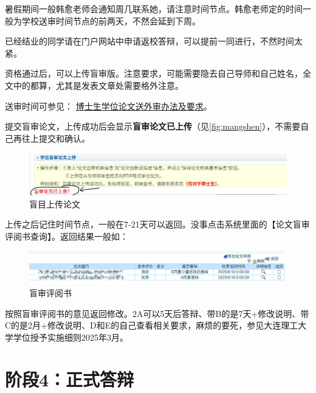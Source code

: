 \documentclass[12pt,a4paper]{ctexart}
\begin{document}
暑假期间一般韩愈老师会通知周几联系她，请注意时间节点。韩愈老师定的时间一般为学校送审时间节点的前两天，不然会延到下周。

已经结业的同学请在门户网站中申请返校答辩，可以提前一同进行，不然时间太紧。

资格通过后，可以上传盲审版。注意要求，可能需要隐去自己导师和自己姓名，全文中的都算，尤其是发表文章处需要格外注意。

送审时间可参见：
\href{https://gs.dlut.edu.cn/info/1207/3992.htm}{博士生学位论文送外审办法及要求}。

提交盲审论文，上传成功后会显示\textbf{盲审论文已上传}（见\autoref{fig:mangshen}），不需要自己再往上提交和确认。

  \begin{figure}[H]
    \centering
    \includegraphics[width=1.0\textwidth]{images/mangshen.jpg}  %
    \caption{盲目上传论文}
    \label{fig:mangshen}
  \end{figure}

 上传之后记住时间节点，一般在7-21天可以返回。没事点击系统里面的【论文盲审评阅书查询】。返回结果一般如：

   \begin{figure}[H]
    \centering
    \includegraphics[width=1.0\textwidth]{images/mangshenfanhui.jpg}  %
    \caption{盲审评阅书}
    \label{fig:mangshenfanhui}
  \end{figure}

  按照盲审评阅书的意见返回修改。2A可以5天后答辩、带B的是7天+修改说明、带C的是2月+修改说明、D和E的自己查看相关要求，麻烦的要死，参见大连理工大学学位授予实施细则2025年3月。
\section{阶段4：正式答辩}
\label{sec:realpre}
\end{document}

